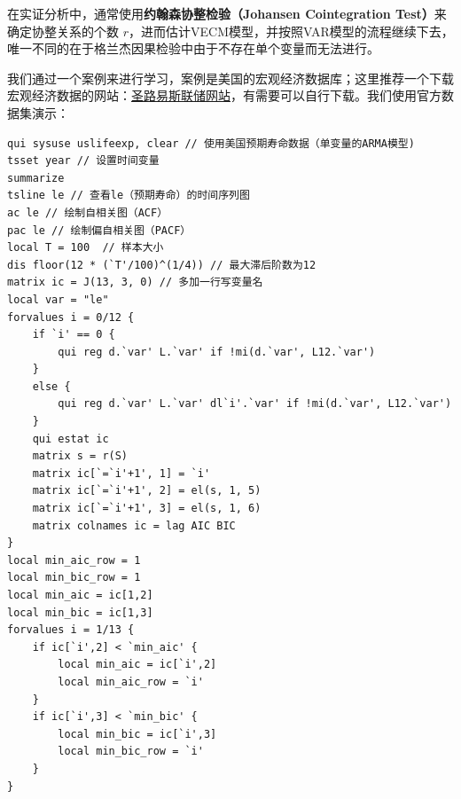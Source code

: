 在实证分析中，通常使用\textbf{约翰森协整检验（Johansen Cointegration Test）}来确定协整关系的个数 $r$，进而估计VECM模型，并按照VAR模型的流程继续下去，唯一不同的在于格兰杰因果检验中由于不存在单个变量而无法进行。

我们通过一个案例来进行学习，案例是美国的宏观经济数据库；这里推荐一个下载宏观经济数据的网站：\href{https://fred.stlouisfed.org/}{圣路易斯联储网站}，有需要可以自行下载。我们使用官方数据集演示：

\begin{tcolorbox}[title=在 Stata 中应用单变量时间序列分析, colback=white, colframe=black, colbacktitle=white, coltitle=black,fonttitle=\bfseries]
\begin{lstlisting}[xleftmargin=2em, commentstyle=\color{black}]
qui sysuse uslifeexp, clear // 使用美国预期寿命数据（单变量的ARMA模型)
tsset year // 设置时间变量
summarize
tsline le // 查看le（预期寿命）的时间序列图
ac le // 绘制自相关图（ACF）
pac le // 绘制偏自相关图（PACF）
local T = 100  // 样本大小
dis floor(12 * (`T'/100)^(1/4)) // 最大滞后阶数为12
matrix ic = J(13, 3, 0) // 多加一行写变量名
local var = "le"
forvalues i = 0/12 {
    if `i' == 0 {
        qui reg d.`var' L.`var' if !mi(d.`var', L12.`var')
    }
    else {
        qui reg d.`var' L.`var' dl`i'.`var' if !mi(d.`var', L12.`var')
    }
    qui estat ic
    matrix s = r(S)
    matrix ic[`=`i'+1', 1] = `i'
    matrix ic[`=`i'+1', 2] = el(s, 1, 5)
    matrix ic[`=`i'+1', 3] = el(s, 1, 6)
	matrix colnames ic = lag AIC BIC
}
local min_aic_row = 1
local min_bic_row = 1
local min_aic = ic[1,2]
local min_bic = ic[1,3]
forvalues i = 1/13 {
    if ic[`i',2] < `min_aic' {
        local min_aic = ic[`i',2]
        local min_aic_row = `i'
    }
    if ic[`i',3] < `min_bic' {
        local min_bic = ic[`i',3]
        local min_bic_row = `i'
    }
}
\end{lstlisting}
\end{tcolorbox}

